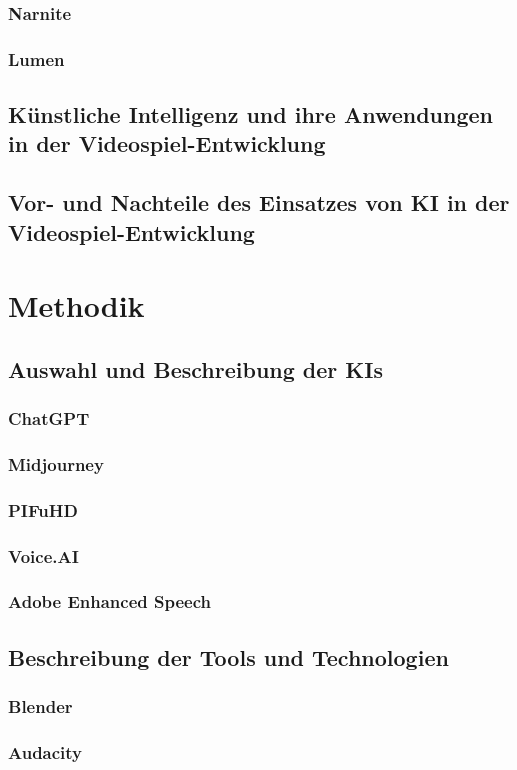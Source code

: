 \documentclass[12pt,a4paper,bibliography=totocnumbered,listof=totocnumbered]{scrartcl}
\begin{document}
\subsubsection{Narnite}
\subsubsection{Lumen}
\subsection{Künstliche Intelligenz und ihre Anwendungen in der Videospiel-Entwicklung}
\subsection{Vor- und Nachteile des Einsatzes von KI in der Videospiel-Entwicklung}
\section{Methodik}
\subsection{Auswahl und Beschreibung der KIs}
\subsubsection{ChatGPT}
\subsubsection{Midjourney}
\subsubsection{PIFuHD}
\subsubsection{Voice.AI}
\subsubsection{Adobe Enhanced Speech}
\subsection{Beschreibung der Tools und Technologien}
\subsubsection{Blender}
\subsubsection{Audacity}
\end{document}
